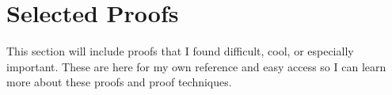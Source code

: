 \section{Selected Proofs}
This section will include proofs that I found difficult, cool, or especially important. These are here for my own reference and easy access so I can 
learn more about these proofs and proof techniques.